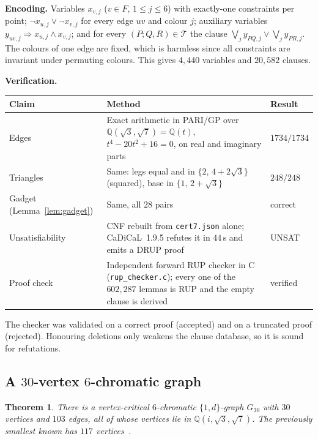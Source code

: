 \documentclass[11pt,a4paper]{amsart}
\newtheorem{theorem}{Theorem}[section]
\theoremstyle{remark}
\newcommand{\Q}{\mathbb{Q}}
\begin{document}
\medskip\noindent\textbf{Encoding.} Variables $x_{v,j}$ ($v\in F$, $1\le j\le6$) with exactly-one constraints per point; $\neg x_{u,j}\vee\neg x_{v,j}$ for every edge $uv$ and colour $j$; auxiliary variables $y_{uv,j}\Rightarrow x_{u,j}\wedge x_{v,j}$; and for every $(P;Q,R)\in\mathcal T$ the clause $\bigvee_j y_{PQ,j}\vee\bigvee_j y_{PR,j}$. The colours of one edge are fixed, which is harmless since all constraints are invariant under permuting colours. This gives $4{,}440$ variables and $20{,}582$ clauses.

\medskip\noindent\textbf{Verification.}

\begin{center}
\small
\begin{tabular}{p{3.4cm}p{8.3cm}l}
\toprule
Claim & Method & Result\\
\midrule
Edges & Exact arithmetic in PARI/GP over $\Q(\sqrt3,\sqrt7)=\Q(t)$, $t^4-20t^2+16=0$, on real and imaginary parts & $1734/1734$\\
Triangles & Same: legs equal and in $\{2,\,4+2\sqrt3\}$ (squared), base in $\{1,\,2+\sqrt3\}$ & $248/248$\\
Gadget (Lemma~\ref{lem:gadget}) & Same, all $28$ pairs & correct\\
Unsatisfiability & CNF rebuilt from \texttt{cert7.json} alone; CaDiCaL~1.9.5 refutes it in $44$\,s and emits a DRUP proof & UNSAT\\
Proof check & Independent forward RUP checker in C (\texttt{rup\_checker.c}); every one of the $602{,}287$ lemmas is RUP and the empty clause is derived & verified\\
\bottomrule
\end{tabular}
\end{center}

\noindent The checker was validated on a correct proof (accepted) and on a truncated proof (rejected). Honouring deletions only weakens the clause database, so it is sound for refutations.

\subsection{A $30$-vertex $6$-chromatic graph}

\begin{theorem}\label{thm:g30}
There is a vertex-critical $6$-chromatic $\{1,d\}$-graph $G_{30}$ with $30$ vertices and $103$ edges, all of whose vertices lie in $\Q(i,\sqrt3,\sqrt7)$. The previously smallest known has $117$ vertices~\cite{DN25}.
\end{theorem}
\end{document}
